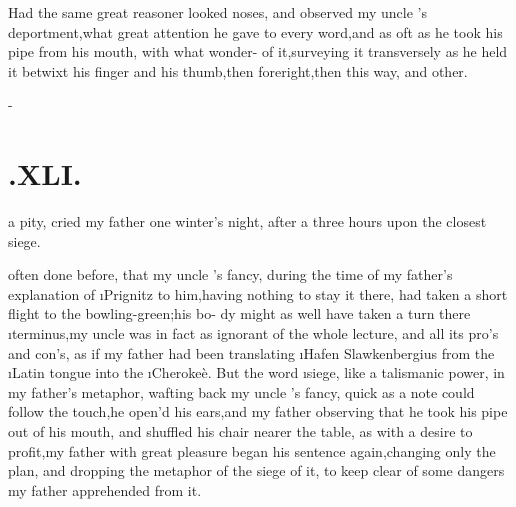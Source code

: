\documentclass[twoside]{article}
\begin{document}
Had the same great reasoner looked  noses, and observed my uncle \toby's
deportment,\tsk what great attention he gave to every
word,\tsk and as oft as he took his pipe from his mouth, with what
wonder-\break {} of
it,\tsk surveying it transversely as he held it betwixt his
finger and his thumb,\break\tsk then foreright,\tsk then
this way, and
other.

\null\kern-\baselineskip
\section{.\quad  XLI.}

 a pity, cried my father
one winter’s night, after a three hours\break
{}
upon the closest siege.\tsh

\noindent
{} often
done before, that my uncle \toby's fancy, during the
time of my father’s explanation of \i{Prignitz} to
him,\tsh having nothing to stay it there, had taken a short
flight to the bowling-green;\tsh his bo-\break
dy might as well have taken a turn there
\i{terminus},\tsh my uncle \toby was in fact\break
as ignorant
of the whole lecture, and all its pro’s and con’s, as if my
father had been translating \i{Hafen Slawkenbergius}\break
from the \i{Latin} tongue into the \i{Cherokeè}.
But the word \i{siege}, like a talismanic\break
power, in my
father’s metaphor, wafting back my uncle \toby's
fancy, quick as a note could follow the touch,\tsk he open’d
his ears,\tsk and my father observing that he took his pipe
out of his mouth, and shuffled his chair nearer the table,
as with a desire to profit,\tsk my father with great
pleasure began his sentence again,\tsh changing only the
plan, and dropping the metaphor of the siege of it, to keep
clear of some dangers my father apprehended from it.
\end{document}
